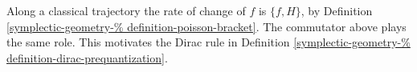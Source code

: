 Along a classical trajectory the rate of
change of $f$ is $\{f,H\}$, by Definition
\ref{symplectic-geometry-%
definition-poisson-bracket}.
The commutator above plays the same role.
This motivates the Dirac rule in Definition
\ref{symplectic-geometry-%
definition-dirac-prequantization}.





